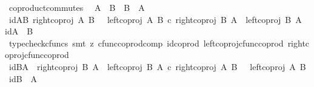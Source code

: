 \begin{isabellebody}
\isanewline
{}\isamarkupfalse%
%
\endisatagproof
{\isafoldproof}%
%
\isadelimproof
%
\endisadelimproof
%
\isadelimdocument
%
\endisadelimdocument
%
\isatagdocument
%
\isamarkuptrue%
%
\endisatagdocument
{\isafolddocument}%
%
\isadelimdocument
%
\endisadelimdocument
{}\isamarkupfalse%
\ coproduct{\isacharunderscore}{\kern0pt}commutes{\isacharcolon}{\kern0pt}\isanewline
\ \ {\isachardoublequoteopen}A\ {\isasymCoprod}\ B\ {\isasymcong}\ B\ {\isasymCoprod}\ A{\isachardoublequoteclose}\isanewline
%
\isadelimproof
%
\endisadelimproof
%
\isatagproof
{}\isamarkupfalse%
\ {\isacharminus}{\kern0pt}\isanewline
\ \ \isamarkupfalse%
\ id{\isacharunderscore}{\kern0pt}AB{\isacharcolon}{\kern0pt}\ {\isachardoublequoteopen}{\isacharparenleft}{\kern0pt}{\isacharparenleft}{\kern0pt}right{\isacharunderscore}{\kern0pt}coproj\ A\ B{\isacharparenright}{\kern0pt}\ \ {\isasymamalg}\ {\isacharparenleft}{\kern0pt}left{\isacharunderscore}{\kern0pt}coproj\ A\ B{\isacharparenright}{\kern0pt}{\isacharparenright}{\kern0pt}\ {\isasymcirc}\isactrlsub c\ {\isacharparenleft}{\kern0pt}{\isacharparenleft}{\kern0pt}right{\isacharunderscore}{\kern0pt}coproj\ B\ A{\isacharparenright}{\kern0pt}\ {\isasymamalg}\ {\isacharparenleft}{\kern0pt}left{\isacharunderscore}{\kern0pt}coproj\ B\ A{\isacharparenright}{\kern0pt}{\isacharparenright}{\kern0pt}\ {\isacharequal}{\kern0pt}\ id{\isacharparenleft}{\kern0pt}A\ {\isasymCoprod}\ B{\isacharparenright}{\kern0pt}{\isachardoublequoteclose}\isanewline
\ \ \ \ \isamarkupfalse%
\ {\isacharparenleft}{\kern0pt}typecheck{\isacharunderscore}{\kern0pt}cfuncs{\isacharcomma}{\kern0pt}\ smt\ {\isacharparenleft}{\kern0pt}z{}{\isacharparenright}{\kern0pt}\ cfunc{\isacharunderscore}{\kern0pt}coprod{\isacharunderscore}{\kern0pt}comp\ id{\isacharunderscore}{\kern0pt}coprod\ left{\isacharunderscore}{\kern0pt}coproj{\isacharunderscore}{\kern0pt}cfunc{\isacharunderscore}{\kern0pt}coprod\ right{\isacharunderscore}{\kern0pt}coproj{\isacharunderscore}{\kern0pt}cfunc{\isacharunderscore}{\kern0pt}coprod{\isacharparenright}{\kern0pt}\isanewline
\ \ \isamarkupfalse%
\ id{\isacharunderscore}{\kern0pt}BA{\isacharcolon}{\kern0pt}\ {\isachardoublequoteopen}\ {\isacharparenleft}{\kern0pt}{\isacharparenleft}{\kern0pt}right{\isacharunderscore}{\kern0pt}coproj\ B\ A{\isacharparenright}{\kern0pt}\ {\isasymamalg}\ {\isacharparenleft}{\kern0pt}left{\isacharunderscore}{\kern0pt}coproj\ B\ A{\isacharparenright}{\kern0pt}{\isacharparenright}{\kern0pt}\ {\isasymcirc}\isactrlsub c\ {\isacharparenleft}{\kern0pt}{\isacharparenleft}{\kern0pt}right{\isacharunderscore}{\kern0pt}coproj\ A\ B{\isacharparenright}{\kern0pt}\ \ {\isasymamalg}\ {\isacharparenleft}{\kern0pt}left{\isacharunderscore}{\kern0pt}coproj\ A\ B{\isacharparenright}{\kern0pt}{\isacharparenright}{\kern0pt}\ {\isacharequal}{\kern0pt}\ id{\isacharparenleft}{\kern0pt}B\ {\isasymCoprod}\ A{\isacharparenright}{\kern0pt}{\isachardoublequoteclose}\isanewline

\end{isabellebody}
